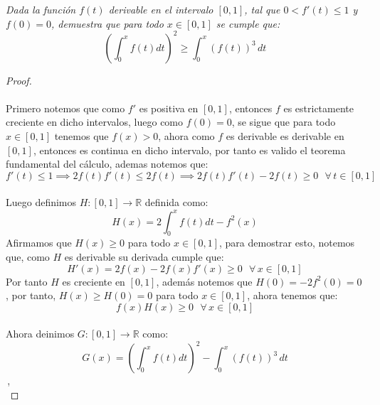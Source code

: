\documentclass[11pt,letterpaper]{article}
\newcommand{\R}{\mathbb{R}}
\begin{document}
\begin{tcolorbox}[ 
	title = \textcolor{black}{\textcolor{white}{Problema 2}},]
\textit{Dada la funci\'on $f(t)$ derivable en el intervalo $[0,1]$, tal que $0<f'(t)\leq 1$ y $f(0)=0$, demuestra que para todo
$x\in [0,1]$ se cumple que:
\begin{equation*}
    \left(\int_{0}^{x} f(t)dt\right)^2\geq \int_{0}^{x}(f(t))^3\,dt
\end{equation*}}
\end{tcolorbox}
\begin{proof}\,\\
    \,\\
    Primero notemos que como $f'$ es positiva en $[0,1]$, entonces $f$ es estrictamente creciente en dicho intervalos, luego como $f(0)=0$, se sigue que para todo $x\in[0,1]$ tenemos que $f(x)>0$, ahora como $f$ es derivable es derivable en $[0,1]$, entonces es continua en dicho intervalo, por tanto es valido el teorema fundamental del c\'alculo, ademas notemos que:
    \begin{equation*}
        f'(t)\leq 1 \implies 2f(t)f'(t)\leq 2f(t)\implies 2f(t)f'(t)-2f(t)\geq 0\,\,\,\,\forall\,t\in[0,1] 
    \end{equation*}\,\\
    Luego definimos $H:[0,1]\to \R$ definida como:
    \begin{equation*}
        H(x)=2\int_{0}^{x}f(t)dt-f^2(x)
    \end{equation*}
    Afirmamos que $H(x)\geq 0$ para todo $x\in[0,1]$, para demostrar esto, notemos que, como $H$ es derivable su derivada cumple que:\,\\
    \begin{equation*}
        H'(x)=2f(x)-2f(x)f'(x)\geq 0\,\,\,\,\forall\,x\in[0,1]
    \end{equation*}
    Por tanto $H$ es creciente en $[0,1]$, adem\'as notemos que $H(0)=-2f^2(0)=0$, por tanto,
    $H(x)\geq H(0)=0$ para todo $x\in[0,1]$, ahora tenemos que:\,\\
    \begin{equation*}
        f(x)H(x)\geq 0\,\,\,\,\forall\,x\in[0,1]
    \end{equation*}\,\\
    Ahora deinimos $G:[0,1]\to \R$ como:\,\\
    \begin{equation*}
        G(x)=\left(\int_{0}^{x} f(t)dt\right)^2-\int_{0}^{x}(f(t))^3\,dt
    \end{equation*}\,,\\

\end{proof}
\end{document}
